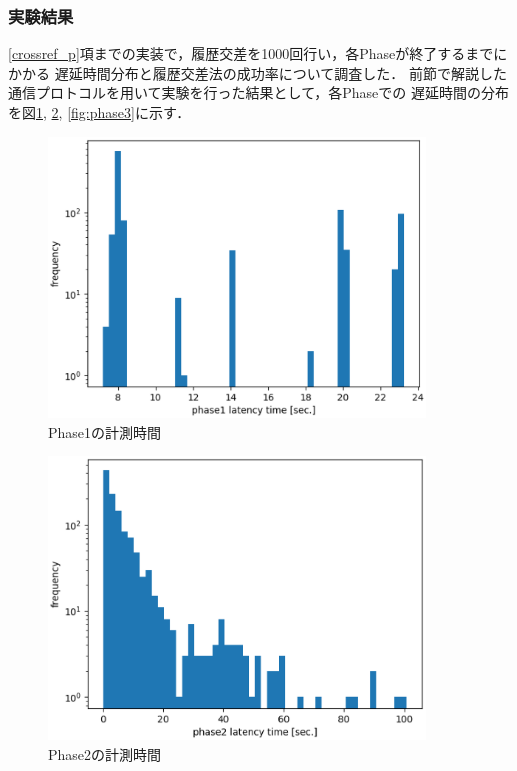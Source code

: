 \documentclass[a4paper,12pt]{jsarticle}
\begin{document}
\subsubsection{実験結果}
\ref{crossref_p}項までの実装で，履歴交差を1000回行い，各Phaseが終了するまでにかかる
遅延時間分布と履歴交差法の成功率について調査した．
前節で解説した通信プロトコルを用いて実験を行った結果として，各Phaseでの
遅延時間の分布を図\ref{fig:phase1}, \ref{fig:phase2}, \ref{fig:phase3}に示す．
%
\begin{figure}[H]%
  \begin{center}
    \includegraphics[width=100mm]{pht/phase1-sec-hist.eps}
  \end{center}
  \caption{Phase1の計測時間}
  \label{fig:phase1}
\end{figure}
%
%
\begin{figure}[H]%
  \begin{center}
    \includegraphics[width=100mm]{pht/phase2-sec-hist.eps}
  \end{center}
  \caption{Phase2の計測時間}
  \label{fig:phase2}
\end{figure}
%
%
\end{document}
